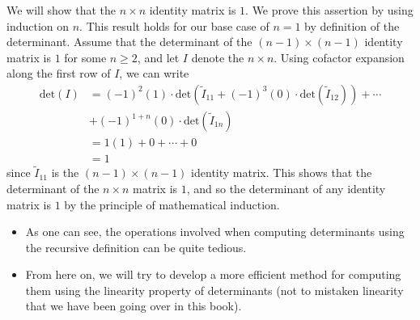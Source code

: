 \begin{eg}
    We will show that the \( n \times n  \) identity matrix is \( 1  \). We prove this assertion by using induction on \( n  \). This result holds for our base case of \( n = 1  \) by definition of the determinant. Assume that the determinant of the \( (n-1) \times (n-1) \) identity matrix is \( 1  \) for some \( n \geq 2  \), and let \( I  \) denote the \( n \times n \). Using cofactor expansion along the first row of \( I  \), we can write
    \begin{align*}
        \text{det}(I) &= (-1)^{2} (1) \cdot \text{det}({\tilde{I}}_{11} + (-1)^{3} (0) \cdot \text{det}({\tilde{I}}_{12})) + \cdots  \\
                      &+ (-1)^{1+n}(0) \cdot \text{det}({\tilde{I}}_{1n}) \\
                      &= 1(1) + 0 + \cdots + 0 \\
                      &= 1
    \end{align*}
    since \( {\tilde{I}}_{11} \) is the \( (n-1) \times (n-1) \) identity matrix. This shows that the determinant of the \( n \times n  \) matrix is \( 1  \), and so the determinant of any identity matrix is \( 1  \) by the principle of mathematical induction.
\end{eg}

\begin{itemize}
    \item As one can see, the operations involved when computing determinants using the recursive definition can be quite tedious.
    \item From here on, we will try to develop a more efficient method for computing them using the linearity property of determinants (not to mistaken linearity that we have been going over in this book).
\end{itemize}

